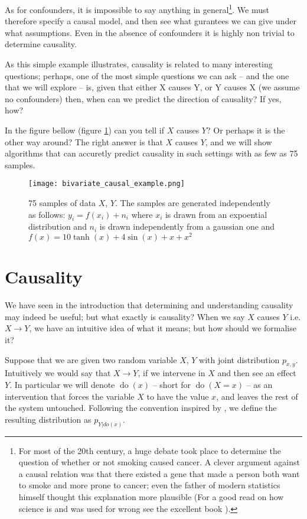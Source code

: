 As for confounders, it is impossible to say anything in general\footnote{
    For most of the 20th century, a huge debate took place to determine the question of whether or not 
    smoking caused cancer. A clever argument against a causal relation was that there existed a gene that 
    made a person both want to smoke and more prone to cancer; even the father of modern statistics
    himself thought this explanation more plausible (For a good read on how science is and was used 
    for wrong see the excellent book \cite{NaomiMerchants}).
    
}. We must therefore specify a causal model, and
then see what gurantees we can give under what assumptions. Even in the absence of confounders it is highly 
non trivial to determine causality.

As this simple example illustrates, causality is related to many interesting questions; perhaps, one of the most 
simple questions we can ask -- and the one that we will explore -- is, given that either X causes Y, or Y causes X
(we assume no confounders) then, when 
can we predict the direction of causality? If yes, how? 

In the figure bellow (figure \ref{fig:simple_bivariate_example}) can you tell if $X$ causes $Y$? Or perhaps
it is the other way around? The right answer is that $X$ causes $Y$, and we will show algorithms that 
can accuretly predict causality in such settings with as few as 75 samples. 

\begin{figure}[H]
    \centering
    \texttt{[image: bivariate\_causal\_example.png]}
    \caption{75 samples of data $X$, $Y$.  The samples are generated independently as follows:
    $y_i = f(x_i) + n_i$ where $x_i$ is drawn from an expoential distribution and $n_i$ is drawn 
    independently from a gaussian one and $f(x) = 10 \tanh(x) + 4\sin(x) + x + x^2$}
    \label{fig:simple_bivariate_example}
\end{figure}

\section{Causality}

We have seen in the introduction that determining and understanding causality may indeed be useful; 
but what exactly is causality? When we say $X$ causes $Y$ i.e. $X \rightarrow Y$, we have an intuitive
idea of what it means; but how should we formalise it?

Suppose that we are given two random variable $X$, $Y$ with joint distribution $p_{x, y}$. Intuitively we 
would say that $X \rightarrow Y$, if we intervene in $X$ and then see an effect $Y$. In particular
we will denote $\operatorname{do}(x)$ -- short for $\operatorname{do}(X = x)$ -- as an intervention
that forces the variable $X$ to have the value $x$, and leaves the rest of the system untouched. 
Following the convention inspired by \cite{pearl2000causality}, 
we define the resulting distribution as $p_{Y|do(x)}$.

